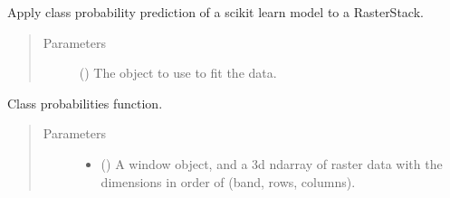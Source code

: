 \documentclass[letterpaper,10pt,english]{sphinxmanual}
\begin{document}
\begin{fulllineitems}

\begin{fulllineitems}
\label{\detokenize{lhat:lhat.Model.MachineLearning.predict_proba}}
Apply class probability prediction of a scikit learn model to a RasterStack.
\begin{quote}\begin{description}
\item[{Parameters}] \leavevmode
{} () \textendash{} The object to use to fit the data.

\end{description}\end{quote}

\end{fulllineitems}


\begin{fulllineitems}
\label{\detokenize{lhat:lhat.Model.MachineLearning.probfun}}
Class probabilities function.
\begin{quote}\begin{description}
\item[{Parameters}] \leavevmode\begin{itemize}
\item {} 
 (\sphinxstyleliteralemphasis{\sphinxupquote{ (}}\sphinxstyleliteralemphasis{\sphinxupquote{, }}\sphinxstyleliteralemphasis{\sphinxupquote{)}}) \textendash{} A window object, and a 3d ndarray of raster data with the dimensions in
order of (band, rows, columns).


\end{itemize}
\end{description}
\end{quote}
\end{fulllineitems}
\end{fulllineitems}
\end{document}
